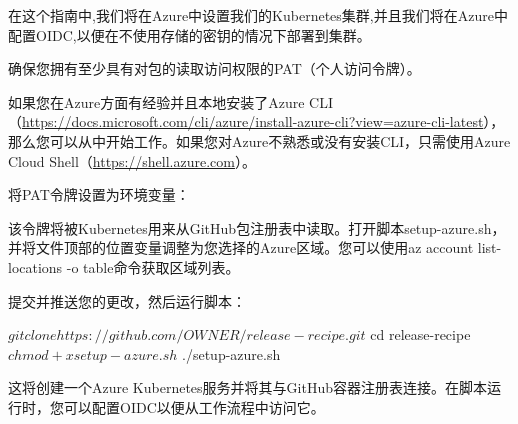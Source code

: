
在这个指南中,我们将在Azure中设置我们的Kubernetes集群,并且我们将在Azure中配置OIDC,以便在不使用存储的密钥的情况下部署到集群。


确保您拥有至少具有对包的读取访问权限的PAT（个人访问令牌）。

如果您在Azure方面有经验并且本地安装了Azure CLI（\url{https://docs.microsoft.com/cli/azure/install-azure-cli?view=azure-cli-latest}），那么您可以从中开始工作。如果您对Azure不熟悉或没有安装CLI，只需使用Azure Cloud Shell（\url{https://shell.azure.com}）。

将PAT令牌设置为环境变量：


该令牌将被Kubernetes用来从GitHub包注册表中读取。打开脚本setup-azure.sh，并将文件顶部的位置变量调整为您选择的Azure区域。您可以使用az account list-locations -o table命令获取区域列表。

提交并推送您的更改，然后运行脚本：

\begin{shell}
$ git clone https://github.com/{OWNER}/release-recipe.git
$ cd release-recipe
$ chmod +x setup-azure.sh
$ ./setup-azure.sh
\end{shell}

这将创建一个Azure Kubernetes服务并将其与GitHub容器注册表连接。在脚本运行时，您可以配置OIDC以便从工作流程中访问它。


